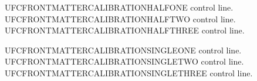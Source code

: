 \documentclass{abntexto-ufc}
\begin{document}
\pretextual


\clearpage
\thispagestyle{empty}

\begingroup
\onehalfsp
UFCFRONTMATTERCALIBRATIONHALFONE control line.\\
UFCFRONTMATTERCALIBRATIONHALFTWO control line.\\
UFCFRONTMATTERCALIBRATIONHALFTHREE control line.
\par
\endgroup

\vspace{3\baselineskip}

\begingroup
\fontsize{10}{12}\selectfont
\singlesp
UFCFRONTMATTERCALIBRATIONSINGLEONE control line.\\
UFCFRONTMATTERCALIBRATIONSINGLETWO control line.\\
UFCFRONTMATTERCALIBRATIONSINGLETHREE control line.
\par
\endgroup
\end{document}
